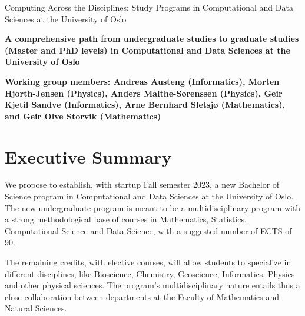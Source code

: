 \documentclass[oneside,final,10pt]{article}
\begin{document}
\thispagestyle{empty}

\begin{center}
{\LARGE\bf
\begin{spacing}{1.25}
Computing Across the Disciplines: Study Programs in Computational and Data Sciences at the University of Oslo
\end{spacing}
}
\end{center}

\begin{center}
{\bf A comprehensive path from undergraduate studies to graduate studies (Master and PhD levels) in Computational and Data Sciences at the University of Oslo }\\ [0mm]
\end{center}

\begin{center}
{\bf Working group members: Andreas Austeng (Informatics), Morten Hjorth-Jensen (Physics), Anders Malthe-S\o renssen (Physics), Geir Kjetil Sandve (Informatics), Arne Bernhard Sletsjø (Mathematics), and Geir Olve Storvik (Mathematics) }\\ [0mm]
\end{center}

\vspace{1cm}


\section*{Executive Summary}

We propose to establish, with startup Fall semester 2023, a new Bachelor of Science program in Computational and Data Sciences at the University of Oslo. 
The new undergraduate program is meant to be a multidisciplinary program with  a strong methodological base of courses in Mathematics, Statistics, Computational Science and Data Science, with a suggested number of ECTS of 90. 

The remaining credits, with elective courses, will allow students to specialize in different disciplines, like Bioscience, Chemistry, Geoscience, Informatics, Physics and other physical sciences. The program's multidisciplinary nature entails thus a close collaboration between departments at the Faculty of Mathematics and Natural Sciences.  
\end{document}
